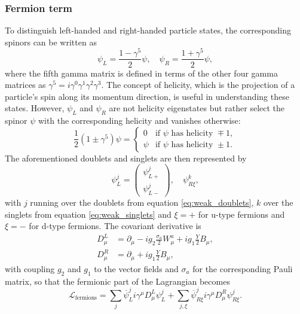 \subsubsection*{Fermion term}
To distinguish left-handed and right-handed particle states, the corresponding spinors can be written as
\begin{equation}
    \psi_L=\frac{1-\gamma^5}{2}\psi, \quad \psi_R=\frac{1+\gamma^5}{2}\psi,
\end{equation}
where the fifth gamma matrix is defined in terms of the other four gamma matrices as $\gamma^5 = i \gamma^0 \gamma^1 \gamma^2 \gamma^3$. The concept of helicity, which is the projection of a particle's spin along its momentum direction, is useful in understanding these states. However, $\psi_{L}$ and $\psi_{R}$ are not helicity eigenstates but rather select the spinor $\psi$ with the corresponding helicity and vanishes otherwise:
\begin{equation}
    \frac{1}{2}(1 \pm \gamma^5)\psi =
    \begin{cases}
        0    & \text{if } \psi \text{ has helicity } \mp1, \\
        \psi & \text{if } \psi \text{ has helicity } \pm1.
    \end{cases}\label{eq:left_handed_state}
\end{equation}
The aforementioned doublets and singlets are then represented by
\begin{equation}
    \psi_L^j=
    \begin{pmatrix}
        \psi_{L+}^j \\ \psi_{L-}^j
    \end{pmatrix},
    \quad \psi_{R\xi}^k,
\end{equation}
with $j$ running over the doublets from equation \ref{eq:weak_doublets}, $k$ over the singlets from equation \ref{eq:weak_singlets} and $\xi=+$ for u-type fermions and $\xi=-$ for d-type fermions.
The covariant derivative is
\begin{align}
    D_\mu^L & =\partial_\mu- i g_2 \frac{{\sigma}_a}{2}W_\mu^a+i g_1\frac{Y}{2}B_\mu, \label{eq:cov_diff_L} \\
    D_\mu^R & =\partial_\mu+ i g_1\frac{Y}{2}B_\mu,
\end{align}
with coupling $g_2$ and $g_1$ to the vector fields and $\sigma_a$ for the corresponding Pauli matrix, so that the fermionic part of the Lagrangian becomes
\begin{equation}
    \mathcal {L}_\text{fermions} = \sum_j\overline{\psi}^j_L i \gamma^\mu D_\mu^L\psi_L^j+\sum_{j,\xi}\overline{\psi}^j_{R\xi} i \gamma^\mu D_\mu^R\psi_{R\xi}^j.
    \label{eq:L_fermion}
\end{equation}

